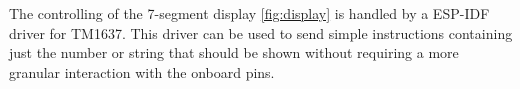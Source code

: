 The controlling of the 7-segment display \ref*{fig:display} is handled by a ESP-IDF driver \cite{esp_idf_tm1637} for TM1637.
This driver can be used to send simple instructions containing just the number or string that should be shown without requiring a more granular interaction with the onboard pins. 

